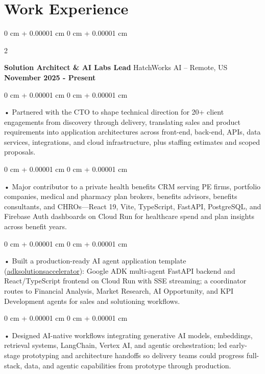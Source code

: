 \documentclass[10pt, letterpaper]{article}
\newenvironment{onecolentry}{
    \begin{adjustwidth}{
        0 cm + 0.00001 cm
    }{
        0 cm + 0.00001 cm
    }
}{
    \end{adjustwidth}
} %
\newenvironment{twocolentry}[2][]{
    \onecolentry
    \def\secondColumn{#2}
    \setcolumnwidth{\fill, 4.5 cm}
    \begin{paracol}{2}
}{
    \switchcolumn \raggedleft \secondColumn
    \end{paracol}
    \endonecolentry
} %
\begin{document}
    \vspace{0.5cm}
    \section{Work Experience}
        \vspace{0.1cm}

        \begin{twocolentry}{
            \textbf{November 2025 - Present}
        }
            \textbf{Solution Architect \& AI Labs Lead} HatchWorks AI -- Remote, US\end{twocolentry}

        \begin{onecolentry}
             • Partnered with the CTO to shape technical direction for 20+ client engagements from discovery through delivery, translating sales and product requirements into application architectures across front-end, back-end, APIs, data services, integrations, and cloud infrastructure, plus staffing estimates and scoped proposals.
        \end{onecolentry}
        \begin{onecolentry}
             • Major contributor to a private health benefits CRM serving PE firms, portfolio companies, medical and pharmacy plan brokers, benefits advisors, benefits consultants, and CHROs---React 19, Vite, TypeScript, FastAPI, PostgreSQL, and Firebase Auth dashboards on Cloud Run for healthcare spend and plan insights across benefit years.
        \end{onecolentry}
        \begin{onecolentry}
             • Built a production-ready AI agent application template (\href{https://github.com/sreenikethaathreya-hw/adksolutionsaccelerator}{adksolutionsaccelerator}): Google ADK multi-agent FastAPI backend and React/TypeScript frontend on Cloud Run with SSE streaming; a coordinator routes to Financial Analysis, Market Research, AI Opportunity, and KPI Development agents for sales and solutioning workflows.
        \end{onecolentry}
        \begin{onecolentry}
             • Designed AI-native workflows integrating generative AI models, embeddings, retrieval systems, LangChain, Vertex AI, and agentic orchestration; led early-stage prototyping and architecture handoffs so delivery teams could progress full-stack, data, and agentic capabilities from prototype through production.
        \end{onecolentry}
\end{document}
